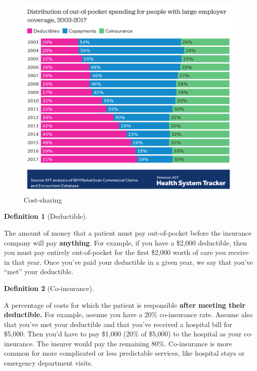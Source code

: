 \documentclass[
  letterpaper,
  DIV=11,
  numbers=noendperiod]{scrreport}
\theoremstyle{definition}
\newtheorem{definition}{Definition}[chapter]
\theoremstyle{remark}
\begin{document}
\begin{figure}

{\centering \includegraphics{part1/../figures/kff-cost-sharing.png}

}

\caption{\label{fig-cost-sharing}Cost-sharing}

\end{figure}

\begin{definition}[Deductible]\protect\hypertarget{def-deductible}{}\label{def-deductible}

The amount of money that a patient must pay out-of-pocket before the
insurance company will pay \textbf{anything}. For example, if you have a
\$2,000 deductible, then you must pay entirely out-of-pocket for the
first \$2,000 worth of care you receive in that year. Once you've paid
your deductible in a given year, we say that you've ``met'' your
deductible.

\end{definition}

\begin{definition}[Co-insurance]\protect\hypertarget{def-coinsurance}{}\label{def-coinsurance}

A percentage of costs for which the patient is responsible \textbf{after
meeting their deductible.} For example, assume you have a 20\%
co-insurance rate. Assume also that you've met your deductible and that
you've received a hospital bill for \$5,000. Then you'd have to pay
\$1,000 (20\% of \$5,000) to the hospital as your co-insurance. The
insurer would pay the remaining 80\%. Co-insurance is more common for
more complicated or less predictable services, like hospital stays or
emergency department visits.

\end{definition}
\end{document}
